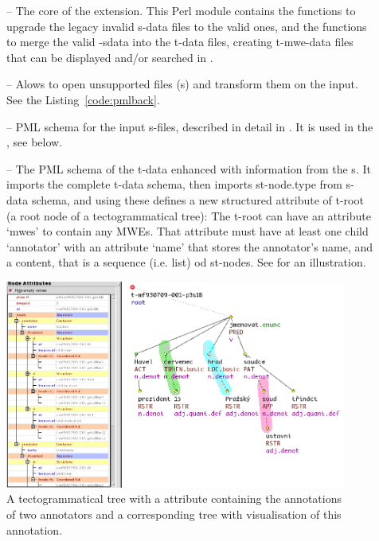 \begin{description}
\item [] -- The core of the extension. This Perl module contains the functions to upgrade the legacy invalid s-data files to the valid ones, and the functions to merge the valid -sdata into the t-data files, creating t-mwe-data files that can be displayed and/or searched in \tred.

\item [] -- Alows to open unsupported files (\stf{}s) and transform them on the input. See the Listing~\ref{code:pmlback}.

\item [] -- PML schema for the input s-files, described in detail in . It is used in the , see below. 

\item [] -- The PML schema of the t-data enhanced with information from the \sf{}s. It imports the complete t-data schema, then imports st-node.type from s-data schema, and using these defines a new structured attribute of t-root (a root node of a tectogrammatical tree): The t-root can have an attribute `mwes' to contain any MWEs. That attribute must have at least one child `annotator' with an attribute `name' that stores the annotator's name, and a content, that is a sequence (i.e. list) od st-nodes. See  for an illustration.

\end{description}

\begin{figure}[htbp]
   \centering
   \includegraphics[width=\textwidth]{images/mwes-attr-in-tred}
   \caption{A tectogrammatical tree with a  attribute containing the annotations of two annotators and a corresponding tree with visualisation of this annotation.}
   \label{fig:mwes-at-t-root}
\end{figure}

